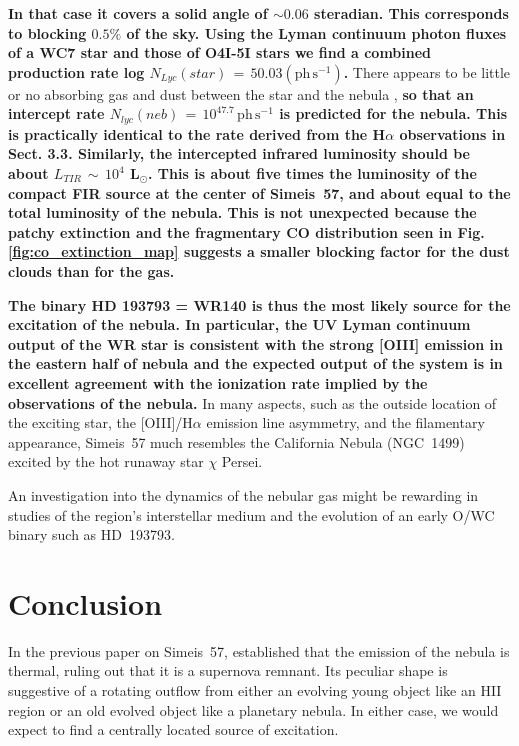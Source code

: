 \documentclass{aa}
\begin{document}
\par \textbf{In that case it covers a solid angle of $\sim0.06$
  steradian. This corresponds to blocking $0.5\%$ of the sky. Using
  the Lyman continuum photon fluxes of a WC7 star
  \citep{Crowther_2007} and those of O4I-5I stars
  \citep{Sternberg_2003} we find a combined production rate log
  $N_{Lyc}(star)\,=\, 50.03 (\mathrm{ph \, s^{-1}})$.} There appears
to be little or no absorbing gas and dust between the star and the
nebula \citep{Arnal2001}, {\bf so that an intercept rate
  $N_{lyc}(neb)\,=\,10^{47.7}\,\mathrm{ph\, s^{-1}}$ is predicted for
  the nebula.  This is practically identical to the rate derived from
  the H$\alpha$ observations in Sect. 3.3. Similarly, the intercepted
  infrared luminosity should be about $L_{TIR}\,\sim\,10^{4}$
  L$_{\odot}$. This is about five times the luminosity of the compact
  FIR source at the center of Simeis~57, and about equal to the total
  luminosity of the nebula. This is not unexpected because the patchy
  extinction and the fragmentary CO distribution seen in
  Fig.\,\ref{fig:co_extinction_map} suggests a smaller blocking factor for
  the dust clouds than for the gas.}
  
\par \textbf{The binary HD 193793 = WR140 is thus the most likely
  source for the excitation of the nebula.  In particular, the UV
  Lyman continuum output of the WR star is consistent with the strong
  [OIII] emission in the eastern half of nebula and the expected
  output of the system is in excellent agreement with the ionization
  rate implied by the observations of the nebula. }
In many aspects, such as the outside location of the exciting star,
the [OIII]/H$\alpha$ emission line asymmetry, and the filamentary
appearance, Simeis~57 much resembles the California Nebula (NGC~1499)
excited by the hot runaway star $\chi$ Persei.

An investigation into the dynamics of the nebular gas might
be rewarding in studies of the region's interstellar
medium and the evolution of an early O/WC binary such as HD~193793.



\section{Conclusion}

In the previous paper on Simeis~57, \cite{israel2003} established that
the emission of the nebula is thermal, ruling out that it is a
supernova remnant. Its peculiar shape is suggestive of a rotating
outflow from either an evolving young object like an HII region or an
old evolved object like a planetary nebula. In either case, we would
expect to find a centrally located source of excitation.
\end{document}
